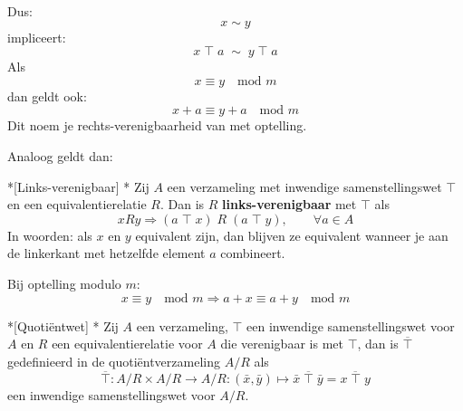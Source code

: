 Dus: 
\begin{equation*}
    x \sim y
\end{equation*}
impliceert:
\begin{equation*}
    x\;\top\;a \;\sim\; y\;\top\;a
\end{equation*}
\textbf{} Als 
\begin{equation*}
    x \equiv y \quad \text{mod } m
\end{equation*}
dan geldt ook:
\begin{equation*}
    x+a \equiv y+a \quad \text{mod } m
\end{equation*}
Dit noem je rechts-verenigbaarheid van  met optelling.


Analoog geldt dan:
\begin{nicedefinition}*[Links-verenigbaar]
    \nextpart[]*
    Zij $A$ een verzameling met inwendige samenstellingswet $\top$ en een equivalentierelatie $R$. Dan is $R$ \textcolor{PineGreen!75!black}{\textbf{links-verenigbaar}} met $\top$ als
    \begin{equation*}
        xRy \Rightarrow (a\;\top\;x) \;R\; (a\;\top\;y), \qquad \forall a \in A
    \end{equation*}
    In woorden: als $x$ en $y$ equivalent zijn, dan blijven ze equivalent wanneer je aan de linkerkant met hetzelfde element $a$ combineert.
\end{nicedefinition}

\textbf{} Bij optelling modulo $m$:
\begin{equation*}
    x \equiv y \quad \text{mod } m \Rightarrow a + x \equiv a + y \quad \text{mod } m
\end{equation*}


\begin{nicetheorem}*[Quotiëntwet]\label{theo:H2_quotientwet}
    \nextpart[]*
    Zij $A$ een verzameling, $\top$ een inwendige samenstellingswet voor $A$ en $R$ een equivalentierelatie voor $A$ die verenigbaar is met $\top$, dan is $\overline{\top}$ gedefinieerd in de quotiëntverzameling $A/R$ als
    \begin{equation*}
        \overline{\top} : A/R \times A/R \to A/R : (\bar{x}, \bar{y}) \mapsto \bar{x}\;\overline{\top}\;\bar{y} = \overline{x\;\top\;y}
    \end{equation*}
    een inwendige samenstellingswet voor $A/R$.
\end{nicetheorem}

